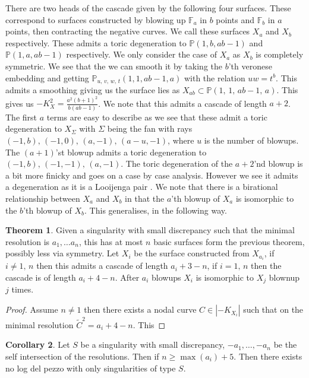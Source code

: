 \documentclass[11pt]{report}
\theoremstyle{definition}
\newtheorem{thm}{Theorem}[section]
\theoremstyle{definition}
\newtheorem{cor}[thm]{Corollary}
\theoremstyle{definition}
\theoremstyle{definition}
\theoremstyle{definition}
\theoremstyle{definition}
\theoremstyle{definition}
\theoremstyle{definition}
\newcommand{\ldp}{log del pezzo }
\newcommand{\mb}[1]{\mathbb{#1}}
\newcommand{\LJ}{Looijenga pair }
\begin{document}
There are two heads of the cascade given by the following four surfaces. These correspond to surfaces constructed by blowing up $\mb{F}_a$ in $b$ points and $\mb{F}_b$ in $a$ points, then contracting the negative curves. We call these surfaces $X_a$ and $X_b$ respectively. These admits a toric degeneration to $\mb{P}(1, b, ab-1)$ and $\mb{P}(1, a, ab-1)$ respectively. We only consider the case of $X_a$ as $X_b$ is completely symmetric. We see that the we can smooth it by taking the $b$'th veronese embedding and  getting $\mb{P}_{u,\,v,\,w,\,t}(1, 1, ab-1, a)$ with the relation $uw = t^b$. This admits a smoothing giving us the surface lies as $X_{ab} \subset \mb{P}(1,\, 1, \, ab-1, \, a)$. This gives us $-K_X^2 = \frac{a^2(b+1)^2}{b(ab-1)}$. We note that this admits a cascade of length $a+2$. The first $a$ terms are easy to describe as we see that these admit a toric degeneration to $X_\Sigma$ with $\Sigma$ being the fan with rays $(-1, b), \, (-1, 0), \, (a, -1), \, (a-u, -1)$, where $u$ is the number of blowups. The $(a+1)$'st blowup admits a toric degeneration to $(-1, b), \, (-1, -1), \, (a, -1)$. The toric degeneration of the $a+2$'nd blowup is a bit more finicky and goes on a case by case analysis. However we see it admits a degeneration as it is a \LJ. We note that there is a birational relationship between $X_a$ and $X_b$ in that the $a$'th blowup of $X_a$ is isomorphic to the $b$'th blowup of $X_b$.  This generalises, in the following way. 
\begin{thm}
Given a singularity with small discrepancy such that the minimal resolution is $a_1, \dots a_n$, this has at most $n$ basic surfaces form the previous theorem, possibly less via symmetry. Let $X_i$ be the surface constructed from $X_{a_i}$, if $i \neq 1,\, n$ then this admits a cascade of length $a_i + 3 - n$, if $i = 1, \, n$ then the cascade is of length $a_i + 4 - n$.  After $a_i$ blowups $X_{i}$ is isomorphic to $X_j$ blownup $j$ times.
\end{thm}
\begin{proof}
Assume $n \neq 1$ then there exists a nodal curve $C \in |-K_{X_i}|$ such that on the minimal resolution $\widetilde{C}^2 = a_i + 4 - n$. This 
\end{proof}
\begin{cor}
Let $S$ be a singularity with small discrepancy, $-a_1, \dots , -a_n$ be the self intersection of the resolutions. Then if $n \geq \max (a_i) + 5 $. Then there exists no \ldp with only singularities of type $S$.
\end{cor}
\end{document}
